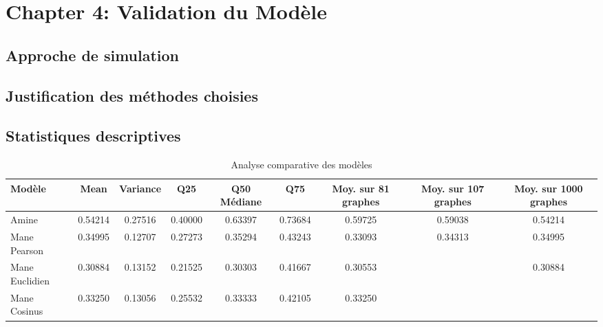 \chapter{Chapter 4: Validation du Modèle }

\section{Approche de simulation}
\section{Justification des méthodes choisies}
\section{Statistiques descriptives }

\begin{table}[h]
\centering
\begin{tabular}{|l|c|c|c|c|c|c|c|c|}
\hline
\textbf{Modèle} & \textbf{Mean} & \textbf{Variance} & \textbf{Q25} & \textbf{Q50 Médiane} & \textbf{Q75} & \textbf{Moy. sur 81 graphes} & \textbf{Moy. sur 107 graphes} & \textbf{Moy. sur 1000 graphes} \\ \hline
Amine           & 0.54214       & 0.27516           & 0.40000      & 0.63397             & 0.73684      & 0.59725                     & 0.59038                        & 0.54214                        \\ \hline
Mane Pearson    & 0.34995       & 0.12707           & 0.27273      & 0.35294             & 0.43243      & 0.33093                     & 0.34313                        & 0.34995                        \\ \hline
Mane Euclidien  & 0.30884       & 0.13152           & 0.21525      & 0.30303             & 0.41667      & 0.30553                     &                               & 0.30884                        \\ \hline
Mane Cosinus    & 0.33250       & 0.13056           & 0.25532      & 0.33333             & 0.42105      & 0.33250                     &                               &                                \\ \hline
\end{tabular}
\caption{Analyse comparative des modèles}
\label{tab:modele_comparaison}
\end{table}

